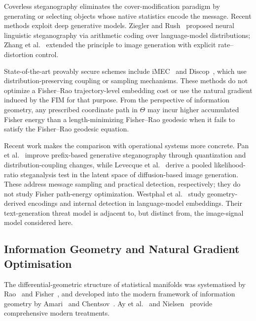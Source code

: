 \documentclass[a4paper,fleqn]{cas-dc}
\begin{document}
Coverless steganography eliminates the cover-modification paradigm by
generating or selecting objects whose native statistics encode the
message.
Recent methods exploit deep generative models.
Ziegler and Rush~\cite{ziegler2019neural} proposed neural linguistic
steganography via arithmetic coding over language-model distributions;
Zhang et al.~\cite{zhang2021generative} extended the principle to image
generation with explicit rate--distortion control.

State-of-the-art provably secure schemes include iMEC~\cite{imec2022}
and Discop~\cite{discop2023}, which use distribution-preserving coupling or
sampling mechanisms.
These methods do not optimize a Fisher--Rao trajectory-level embedding cost or
use the natural gradient induced by the FIM for that purpose.
From the perspective of information geometry, any prescribed coordinate path in
$\Theta$ may incur higher accumulated Fisher energy than a length-minimizing
Fisher--Rao geodesic when it fails to satisfy the Fisher--Rao geodesic equation.

Recent work makes the comparison with operational systems more concrete.
Pan et al.~\cite{pan2025rethinking} improve prefix-based generative
steganography through quantization and distribution-coupling changes, while
Levecque et al.~\cite{levecque2026targeted} derive a pooled likelihood-ratio
steganalysis test in the latent space of diffusion-based image generation.
These address message sampling and practical detection, respectively; they do
not study Fisher path-energy optimization. Westphal et
al.~\cite{westphal2026hide} study geometry-derived encodings and internal
detection in language-model embeddings. Their text-generation threat model is
adjacent to, but distinct from, the image-signal model considered here.

\subsection{Information Geometry and Natural Gradient Optimisation}

The differential-geometric structure of statistical manifolds was
systematised by Rao~\cite{rao1945information} and
Fisher~\cite{fisher1925theory}, and developed into the modern framework
of information geometry by Amari~\cite{amari1985differential,amari2000methods,amari1998natural}
and Chentsov~\cite{chentsov1982statistical}.
Ay et al.~\cite{ay2017information} and Nielsen~\cite{nielsen2020elementary}
provide comprehensive modern treatments.
\end{document}
